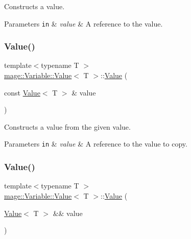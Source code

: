 Constructs a value.


\begin{DoxyParams}[1]{Parameters}
\mbox{\tt in}  & {\em value} & A reference to the value. \\
\hline
\end{DoxyParams}
\hypertarget{structmage_1_1_variable_1_1_value_a962f7d07d601fd5d1a2c24f892607e16}{}\label{structmage_1_1_variable_1_1_value_a962f7d07d601fd5d1a2c24f892607e16} 
\subsubsection{\texorpdfstring{Value()}{Value()}\hspace{0.1cm}{\footnotesize\ttfamily [2/3]}}
{\footnotesize\ttfamily template$<$typename T $>$ \\
\hyperlink{structmage_1_1_variable_1_1_value}{mage\+::\+Variable\+::\+Value}$<$ T $>$\+::\hyperlink{structmage_1_1_variable_1_1_value}{Value} (\begin{DoxyParamCaption}\item[{const \hyperlink{structmage_1_1_variable_1_1_value}{Value}$<$ T $>$ \&}]{value }\end{DoxyParamCaption})\hspace{0.3cm}{\ttfamily [default]}}

Constructs a value from the given value.


\begin{DoxyParams}[1]{Parameters}
\mbox{\tt in}  & {\em value} & A reference to the value to copy. \\
\hline
\end{DoxyParams}
\hypertarget{structmage_1_1_variable_1_1_value_aeadb858e9a40f211c787cacc2fb2843b}{}\label{structmage_1_1_variable_1_1_value_aeadb858e9a40f211c787cacc2fb2843b} 
\subsubsection{\texorpdfstring{Value()}{Value()}\hspace{0.1cm}{\footnotesize\ttfamily [3/3]}}
{\footnotesize\ttfamily template$<$typename T $>$ \\
\hyperlink{structmage_1_1_variable_1_1_value}{mage\+::\+Variable\+::\+Value}$<$ T $>$\+::\hyperlink{structmage_1_1_variable_1_1_value}{Value} (\begin{DoxyParamCaption}\item[{\hyperlink{structmage_1_1_variable_1_1_value}{Value}$<$ T $>$ \&\&}]{value }\end{DoxyParamCaption})\hspace{0.3cm}{\ttfamily [default]}}


